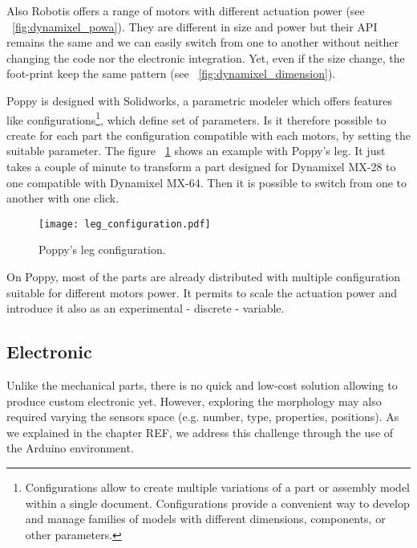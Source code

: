 Also Robotis offers a range of motors with different actuation power (see \figurename~\ref{fig:dynamixel_powa}). They are different in size and power but their API remains the same and we can easily switch from one to another without neither changing the code nor the electronic integration. Yet, even if the size change, the foot-print keep the same pattern (see \figurename~\ref{fig:dynamixel_dimension}).

Poppy is designed with Solidworks, a parametric modeler which offers features like configurations\footnote{Configurations allow to create multiple variations of a part or assembly model within a single document. Configurations provide a convenient way to develop and manage families of models with different dimensions, components, or other parameters.}, which define set of parameters. Is it therefore possible to create for each part the configuration compatible with each motors, by setting the suitable parameter. The figure \figurename~\ref{fig:leg_configuration} shows an example with Poppy's leg. It just takes a couple of minute to transform a part designed for Dynamixel MX-28 to one compatible with Dynamixel MX-64. Then it is possible to switch from one to another with one click.

\begin{figure}[h]
    \begin{center}
        \texttt{[image: leg\_configuration.pdf]}
    \end{center}
    \caption{Poppy's leg configuration.}
    \label{fig:leg_configuration}
\end{figure}

On Poppy, most of the parts are already distributed with multiple configuration suitable for different motors power. It permits to scale the actuation power and introduce it also as an experimental - discrete - variable.


\subsection{Electronic} %

Unlike the mechanical parts, there is no quick and low-cost solution allowing to produce custom electronic yet.
However, exploring the morphology may also required varying the sensors space (e.g. number, type, properties, positions). As we explained in the chapter REF, we address this challenge through the use of the Arduino environment.

